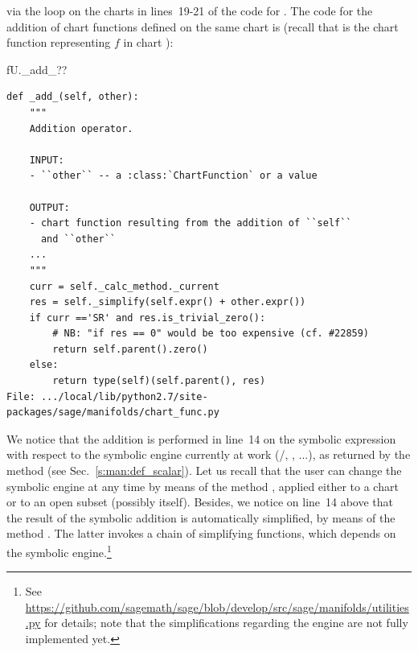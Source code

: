 via the loop on the charts in lines~19-21 of the code for .
The code for the addition of chart functions defined on the same chart
is (recall that  is the chart function representing $f$ in chart ):
\begin{NBin}
fU._add_??
\end{NBin}
\begin{lstlisting}
def _add_(self, other):
    """
    Addition operator.

    INPUT:
    - ``other`` -- a :class:`ChartFunction` or a value

    OUTPUT:
    - chart function resulting from the addition of ``self``
      and ``other``
    ...
    """
    curr = self._calc_method._current
    res = self._simplify(self.expr() + other.expr())
    if curr =='SR' and res.is_trivial_zero():
        # NB: "if res == 0" would be too expensive (cf. #22859)
        return self.parent().zero()
    else:
        return type(self)(self.parent(), res)
File: .../local/lib/python2.7/site-packages/sage/manifolds/chart_func.py
\end{lstlisting}
We notice that the addition is performed in line~14 on the symbolic expression
with respect to the symbolic engine currently at work (\Sage{}/, , ...), as returned by
the method  (see Sec.~\ref{s:man:def_scalar}).
Let us recall that the user can change the symbolic engine at any time
by means of the method , applied either to
a chart or to an open subset (possibly  itself).
Besides, we notice on line~14 above that the result of the symbolic addition
is automatically simplified, by means of the method .
The latter invokes a chain of simplifying functions, which depends on the
symbolic engine.\footnote{See
\url{https://github.com/sagemath/sage/blob/develop/src/sage/manifolds/utilities.py}
for details; note that the simplifications regarding the  engine are not
fully implemented yet.}

